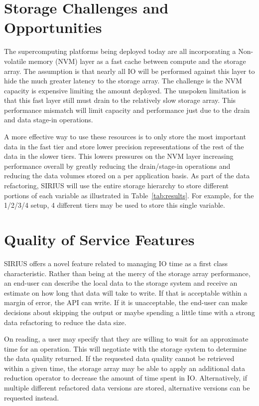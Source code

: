 \documentclass[letterpaper,twocolumn,10pt]{article}
\begin{document}
\section{Storage Challenges and Opportunities}
\label{sec:storage}

The supercomputing platforms being deployed today are all incorporating a
Non-volatile memory (NVM) layer as a fast cache between compute and the storage
array. The assumption is that nearly all IO will be performed against this
layer to hide the much greater latency to the storage array. The challenge is
the NVM capacity is expensive limiting the amount deployed. The unspoken
limitation is that this fast layer still must drain to the relatively slow
storage array. This performance mismatch will limit capacity and performance
just due to the drain and data stage-in operations.

A more effective way to use these resources is to only store the most
important data in the fast tier and store lower precision representations of
the rest of the data in the slower tiers. This lowers pressures on the NVM
layer increasing performance overall by greatly reducing the drain/stage-in
operations and reducing the data volumes stored on a per application basis.
As part of the data refactoring, SIRIUS will use the entire storage hierarchy
to store different portions of each variable as illustrated in
Table~\ref{tab:results}. For example, for the 1/2/3/4 setup, 4 different tiers
may be used to store this single variable.

\section{Quality of Service Features}
\label{sec:qos}

SIRIUS offers a novel feature related to managing IO time as a first class
characteristic. Rather than being at the mercy of the storage array
performance, an end-user can describe the local data to the storage system and
receive an estimate on how long that data will take to write. If that is
acceptable within a margin of error, the API can write. If it is unacceptable,
the end-user can make decisions about skipping the output or maybe spending a
little time with a strong data refactoring to reduce the data size.

On reading, a user may specify that they are willing to wait for an approximate
time for an operation. This will negotiate with the storage system to determine
the data quality returned. If the requested data quality cannot be retrieved
within a given time, the storage array may be able to apply an additional
data reduction operator to decrease the amount of time spent in IO.
Alternatively, if multiple different refactored data versions are stored,
alternative versions can be requested instead.
\end{document}
